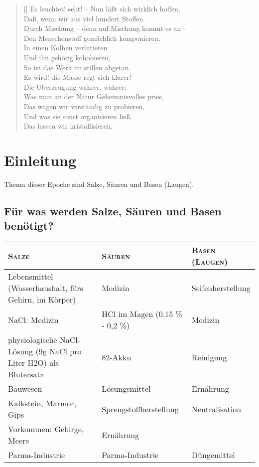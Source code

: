 \settowidth{\versewidth}{Durch Mischung – denn auf Mischung kommt es an -}
\begin{verse}[\versewidth]
    Es leuchtet! seht! -- Nun läßt sich wirklich hoffen,\\
    Daß, wenn wir aus viel hundert Stoffen\\
    Durch Mischung -- denn auf Mischung kommt es an -\\
    Den Menschenstoff gemächlich komponieren,\\
    In einen Kolben verlutieren\\
    Und ihn gehörig kohobieren,\\
    So ist das Werk im stillen abgetan.\\
    Es wird! die Masse regt sich klarer!\\
    Die Überzeugung wahrer, wahrer:\\
    Was man an der Natur Geheimnisvolles pries,\\
    Das wagen wir verständig zu probieren,\\
    Und was sie sonst organisieren ließ,\\
    Das lassen wir kristallisieren.\\
\end{verse}
\newpage

\section{Einleitung}
Thema dieser Epoche sind Salze, Säuren und Basen (Laugen).

\subsection{Für was werden Salze, Säuren und Basen benötigt?}
\begin{tabularx}{\textwidth}{|X|X|X|}
\hline \textsc{Salze} & \textsc{Säuren} & \textsc{Basen (Laugen)} \\
\hline Lebensmittel (Wasserhaushalt, fürs Gehirn, im Körper) & Medizin & Seifenherstellung \\
\hline \acl{NaCl}: Medizin & \acl{HCl} im Magen (0,15 \% - 0,2 \%)  & Medizin \\
\hline physiologische \acl{NaCl}-Lösung (9g \acl{NaCl} pro Liter \acl{H2O}) als Blutersatz & \acl{82}-Akku & Reinigung \\
\hline Bauwesen & Lösungsmittel & Ernährung \\
\hline Kalkstein, Marmor, Gips & Sprengstoffherstellung & Neutralisation \\
\hline Vorkommen: Gebirge, Meere & Ernährung & \\
\hline Parma-Industrie & Parma-Industrie & Düngemittel \\
\hline
\end{tabularx}

